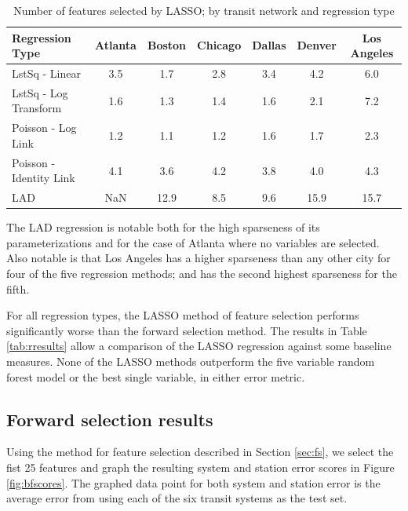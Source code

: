 \documentclass[11pt]{article}
\begin{document}
\begin{table}[H]
\begingroup\fontsize{10}{15}\selectfont
\centering
\begin{tabular}{l|cccccc}
Regression Type&Atlanta&Boston&Chicago&Dallas&Denver&Los Angeles\\
\midrule
LstSq - Linear&3.5&1.7&2.8&3.4&4.2&6.0\\
LstSq - Log Transform&1.6&1.3&1.4&1.6&2.1&7.2\\
Poisson - Log Link&1.2&1.1&1.2&1.6&1.7&2.3\\
Poisson - Identity Link&4.1&3.6&4.2&3.8&4.0&4.3\\
LAD&NaN&12.9&8.5&9.6&15.9&15.7\\
\end{tabular}
\caption{Number of features selected by LASSO; by transit network and regression type}\label{tab:lassoFeatSparse}
\endgroup
\end{table}

The LAD regression is notable both for the high sparseness of its parameterizations and for the case of Atlanta where no variables are selected. Also notable is that Los Angeles has a higher sparseness than any other city for four of the five regression methods; and has the second highest sparseness for the fifth.


For all regression types, the LASSO method of feature selection performs significantly worse than the forward selection method.  The results in Table \ref{tab:rresults} allow a comparison of the LASSO regression against some baseline measures. None of the LASSO methods outperform the five variable random forest model or the best single variable, in either error metric. 


\subsection{Forward selection results}

Using the method for feature selection described in Section \ref{sec:fs}, we select the fist 25 features and graph the resulting system and station error scores in Figure \ref{fig:bfscores}. The graphed data point for both system and station error is the average error from using each of the six transit systems as the test set. 
\end{document}
